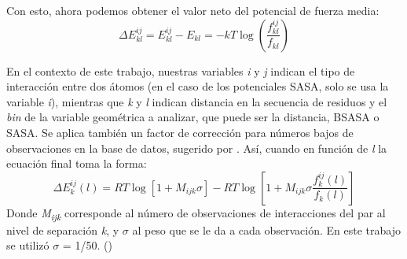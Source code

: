 Con esto, ahora podemos obtener el valor neto del potencial de fuerza media:
\begin{equation}
\Delta E^{ij}_{kl} = E^{ij}_{kl} - E_{kl} = -kT\log \left( \frac{f^{ij}_{kl}}{f_{kl}} \right)
\end{equation}
\par
En el contexto de este trabajo, nuestras variables \textit{i} y \textit{j} indican el tipo de interacción
entre dos átomos (en el caso de los potenciales SASA, solo se usa la variable \textit{i}), mientras 
que \textit{k} y \textit{l} indican distancia en la secuencia de residuos y el \textit{bin} de la 
variable geométrica a analizar, que puede ser la distancia, BSASA o SASA.
Se aplica también un factor de corrección para números bajos de observaciones en la base de datos, sugerido
por \cite{Sippl1990}. 
Así, cuando en función de \textit{l} la ecuación final toma la forma:
\begin{equation}
\Delta E^{ij}_{k}(l) = RT\log \left[1 + M_{ijk}\sigma\right] - RT\log \left[ 1 + M_{ijk}\sigma \frac{f^{ij}_{k}(l)}{f_{k}(l)} \right] \label{finalboltz}
\end{equation}
Donde \textit{M\textsubscript{ijk}} corresponde al número de observaciones de interacciones del par al 
nivel de separación \textit{k}, y $\sigma$ al peso que se le da a cada observación. 
En este trabajo se utilizó $\sigma$ = 1/50. (\cite{Sippl1990,Melo1997})



